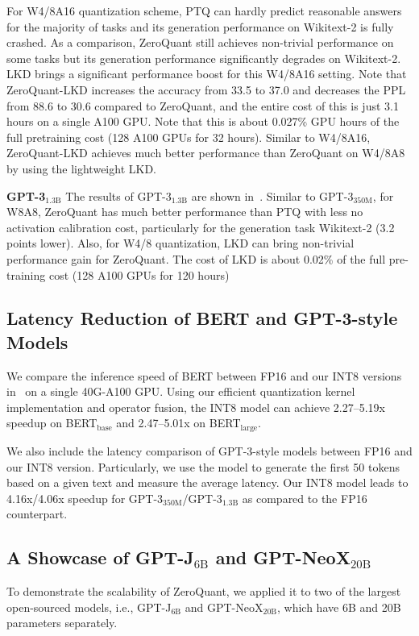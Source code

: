 For W4/8A16 quantization scheme, PTQ can hardly predict reasonable answers for the majority of tasks and its generation performance on Wikitext-2 is fully crashed. As a comparison, ZeroQuant still achieves non-trivial performance on some tasks but its generation performance significantly degrades on Wikitext-2. LKD brings a significant performance boost for this W4/8A16 setting. Note that ZeroQuant-LKD increases the accuracy from 33.5 to 37.0 and decreases the PPL from 88.6 to 30.6 compared to ZeroQuant, and the entire cost of this is just 3.1 hours on a single A100 GPU. Note that this is about 0.027\% GPU hours of the full pretraining cost (128 A100 GPUs for 32 hours). Similar to W4/8A16, ZeroQuant-LKD achieves much better performance than ZeroQuant on W4/8A8 by using the lightweight LKD. 

\textbf{GPT-3$_{\text{1.3B}}$}
The results of GPT-3$_{\text{1.3B}}$ are shown in~. 
Similar to GPT-3$_{\text{350M}}$, for W8A8, ZeroQuant has much better performance than PTQ with less no activation calibration cost, particularly for the generation task Wikitext-2 (3.2 points lower). Also, for W4/8 quantization, LKD can bring non-trivial performance gain for ZeroQuant. The cost of LKD is about 0.02\% of the full pre-training cost (128 A100 GPUs for 120 hours)

\subsection{Latency Reduction of BERT and GPT-3-style Models} We compare the inference speed of BERT between FP16 and our INT8 versions in~ on a single 40G-A100 GPU. Using our efficient quantization kernel implementation and operator fusion, the INT8 model can achieve 2.27--5.19x speedup on BERT$_\text{base}$ and 2.47--5.01x on BERT$_{\text{large}}$. 

We also include the latency comparison of GPT-3-style models between FP16 and our INT8 version. Particularly, we use the model to generate the first 50 tokens based on a given text and measure the average latency. Our INT8 model leads to 4.16x/4.06x speedup for GPT-3$_{\text{350M}}$/GPT-3$_{\text{1.3B}}$ as compared to the FP16 counterpart. 

\subsection{A Showcase of GPT-J$_{\text{6B}}$ and GPT-NeoX$_{\text{20B}}$}
To demonstrate the scalability of ZeroQuant, we applied it to two of the largest open-sourced models, i.e., GPT-J$_{\text{6B}}$ and GPT-NeoX$_{\text{20B}}$, which have 6B and 20B parameters separately. 

